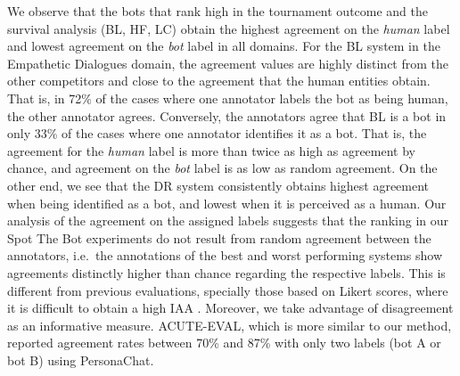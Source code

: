 \documentclass[11pt,a4paper]{article}
\begin{document}


We observe that the bots that rank high in the tournament outcome and the survival analysis (BL, HF, LC) obtain the highest agreement on the \emph{human} label and lowest agreement on the \emph{bot} label in all domains. For the BL system in the Empathetic Dialogues domain, the agreement values are highly distinct from the other competitors and close to the agreement that the human entities obtain. That is, in 72\% of the cases where one annotator labels the bot as being human, the other annotator agrees. Conversely, the annotators agree that BL is a bot in only 33\% of the cases where one annotator identifies it as a bot. That is, the agreement for the \emph{human} label is more than twice as high as agreement by chance, and agreement on the \emph{bot} label is as low as random agreement. On the other end, we see that the DR system consistently obtains highest agreement when being identified as a bot, and lowest when it is perceived as a human. 
Our analysis of the agreement on the assigned labels suggests that the ranking in our Spot The Bot experiments do not result from random agreement between the annotators, i.e.\ the annotations of the best and worst performing systems show agreements distinctly higher than chance regarding the respective labels. This is different from previous evaluations, specially those based on Likert scores, where it is difficult to obtain a high IAA \cite{bishop2015use}. Moreover, we take advantage of disagreement as an informative measure. ACUTE-EVAL, which is more similar to our method, reported agreement rates between 70\% and 87\% with only two labels (bot A or bot B) using PersonaChat.

\end{document}
